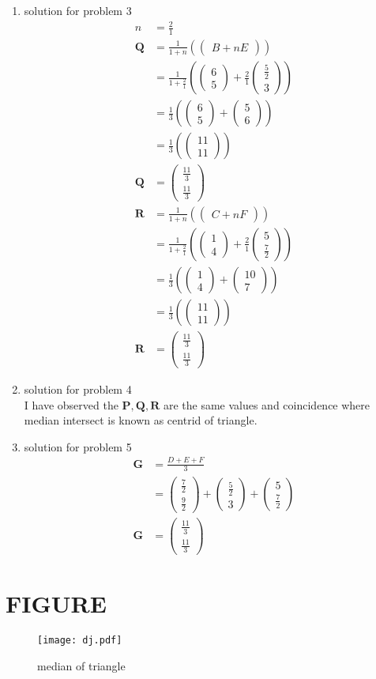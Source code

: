 \documentclass[12pt]{article}
\providecommand{\brak}[1]{\ensuremath{\left(#1\right)}}
\newcommand{\myvec}[1]{\ensuremath{\begin{pmatrix}#1\end{pmatrix}}}
\let\vec\mathbf
\begin{document}
\begin{enumerate}
\item solution for problem 3
\begin{align}
n&=\frac{2}{1}\\
\vec{Q}&=\frac{1}{1+n}\brak{\myvec{B+nE}}\\
&=\frac{1}{1+\frac{2}{1}}\brak{\myvec{6\\5}+\frac{2}{1}\myvec{\frac{5}{2}\\ 3}}\\
&=\frac{1}{3}\brak{\myvec{6\\5}+\myvec{5\\6}}\\
&=\frac{1}{3}\brak{\myvec{11\\11}}\\
\vec{Q}&=\myvec{\frac{11}{3}\\[2pt] \frac{11}{3}}\\
\vec{R}&=\frac{1}{1+n}\brak{\myvec{C+nF}}\\
&=\frac{1}{1+\frac{2}{1}}\brak{\myvec{1\\4}+\frac{2}{1}\myvec{5\\ \frac{7}{2}}}\\
&=\frac{1}{3}\brak{\myvec{1\\4}+\myvec{10\\7}}\\
&=\frac{1}{3}\brak{\myvec{11\\11}}\\
\vec{R}&=\myvec{\frac{11}{3}\\[2pt] \frac{11}{3}}
\end{align}

\item solution for problem 4
   \\I have observed the $\vec{P},\vec{Q},\vec{R}$ are the same values and coincidence where median intersect is known as centrid of triangle.
   
\item solution for problem 5
\begin{align}
\vec{G}&=\frac{D+E+F}{3}\\
&=\myvec{\frac{7}{2}\\[2pt] \frac{9}{2}}+\myvec{\frac{5}{2}\\ 3}+\myvec{5\\ \frac{7}{2}}\\
\vec{G}&=\myvec{\frac{11}{3}\\[2pt] \frac{11}{3}}
\end{align} 
\end{enumerate}
\section{FIGURE}
\begin{figure}[h!]
\centering
\texttt{[image: dj.pdf]}
\caption{median of triangle}
  \label{fig:Figure}
\end{figure}
\end{document}
